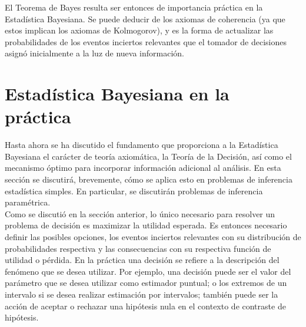 
El Teorema de Bayes resulta ser entonces de importancia práctica en la Estadística Bayesiana. Se puede deducir de los axiomas de coherencia (ya que estos implican los axiomas de Kolmogorov), y es la forma de actualizar las probabilidades de los eventos inciertos relevantes que el tomador de decisiones asignó inicialmente a la luz de nueva información.







\section{Estadística Bayesiana en la práctica}



Hasta ahora se ha discutido el fundamento que proporciona a la Estadística Bayesiana el carácter de teoría axiomática, la Teoría de la Decisión, así como el mecanismo óptimo para incorporar información adicional al análisis. En esta sección se discutirá, brevemente, cómo se aplica esto en problemas de inferencia estadística simples. En particular, se discutirán problemas de inferencia paramétrica.\\



Como se discutió en la sección anterior, lo único necesario para resolver un problema de decisión es maximizar la utilidad esperada. Es entonces necesario definir las posibles opciones, los eventos inciertos relevantes con su distribución de probabilidades respectiva y las consecuencias con su respectiva función de utilidad o pérdida. En la práctica una decisión se refiere a la descripción del fenómeno que se desea utilizar. Por ejemplo, una decisión puede ser el valor del parámetro que se desea utilizar como estimador puntual; o los extremos de un intervalo si se desea realizar estimación por intervalos; también puede ser la acción de aceptar o rechazar una hipótesis nula en el contexto de contraste de hipótesis. \\



